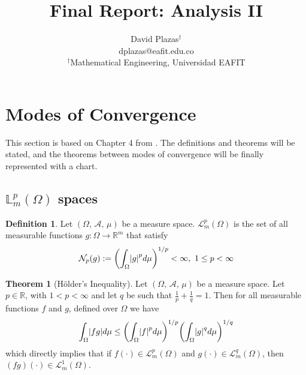 \documentclass[11pt,letterpaper]{article}
\author{David Plazas$^\dag$ \\\vspace{0.3cm}\small{dplazas@eafit.edu.co}\\
$^\dag$Mathematical Engineering, Universidad EAFIT}
\title{Final Report: Analysis II}
\newcommand{\LL}{{\mathbb{L}}}
\newcommand{\RR}{{\mathbb{R}}}
\newcommand{\el}{{\mathcal{L}}}
\let\originalleft\left
\let\originalright\right
\renewcommand{\left}{\mathopen{}\mathclose\bgroup\originalleft}
\renewcommand{\right}{\aftergroup\egroup\originalright}
\theoremstyle{definition}
\newtheorem{definition}{Definition}[section]
\newtheorem{theorem}{Theorem}[section]
\begin{document}
\maketitle
\section{Modes of Convergence}
This section is based on Chapter 4 from \cite{myriam2002introduccion}. The definitions and theorems will be stated, and the theorems between modes of convergence will be finally represented with a chart.

\subsection{$\LL^p_m(\Omega)$ spaces}
\begin{definition}
Let $(\Omega,\, \mathcal{A},\, \mu)$ be a measure space. $\el^p_m(\Omega)$ is the set of all measurable functions $g:\Omega\rightarrow\RR^m$ that satisfy 
\begin{equation}
    \mathcal{N}_p(g):=\left(\int_\Omega\left|g\right|^pd\mu\right)^{1/p}<\infty, \ 1\leq p<\infty
\end{equation}
\end{definition}

\begin{theorem}[H\"older's Inequality]
Let $(\Omega,\, \mathcal{A},\, \mu)$ be a measure space. Let $p\in\RR$, with $1<p<\infty$ and let $q$ be such that $\frac{1}{p} + \frac{1}{q}=1$. Then for all measurable functions $f$ and $g$, defined over $\Omega$ we have
\begin{equation}
    \int_\Omega\left|fg\right|d\mu \leq \left(\int_\Omega\left|f\right|^pd\mu\right)^{1/p}\left(\int_\Omega\left|g\right|^qd\mu\right)^{1/q}
\end{equation}
which directly implies that if $f(\cdot)\in\el^p_m(\Omega)$ and $g(\cdot)\in\el_m^q(\Omega)$, then $(fg)(\cdot)\in\el^1_m(\Omega)$.
\end{theorem}
\end{document}

